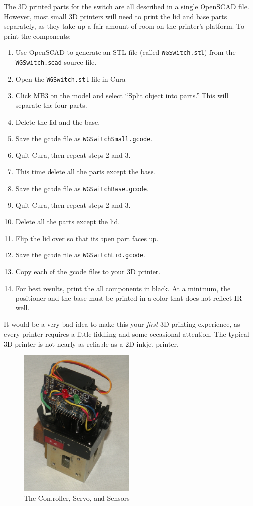 \documentclass[12pt]{article}
\begin{document}
The 3D printed parts for the switch are all described in a single
OpenSCAD file.  However, most small 3D printers will need to print
the lid and base parts separately, as they take up a fair amount
of room on the printer's platform.
To print the components:
\begin{enumerate}
\setlength\itemsep{0em}
\item Use OpenSCAD to generate an STL file (called {\tt WGSwitch.stl}) from
  the {\tt WGSwitch.scad} source file.
\item Open the {\tt WGSwitch.stl} file in Cura
\item Click MB3 on the model and select ``Split object into parts.''
  This will separate the four parts.
\item Delete the lid and the  base.
\item Save the gcode file as {\tt WGSwitchSmall.gcode}.
\item Quit Cura, then repeat steps 2 and 3.
\item This time delete all the parts except the base.
\item Save the gcode file as {\tt WGSwitchBase.gcode}.
\item Quit Cura, then repeat steps 2 and 3.
\item Delete all the parts except the lid.
\item Flip the lid over so that its open part faces up.
\item Save the gcode file as {\tt WGSwitchLid.gcode}.
\item Copy each of the gcode files to your 3D printer.
\item For best results, print the all components in black.
  At a minimum, the positioner and the base must be printed
  in a color that does not reflect IR well.
  \end{enumerate}

It would be a very bad idea to make this your {\em first} 3D printing
experience, as every printer requires a little fiddling and some
occasional attention.  The typical 3D printer is not nearly as
reliable as a 2D inkjet printer.

\begin{figure}[tb]
  \centering
  \includegraphics[width=0.5\textwidth]{BareModule.jpg}
  \caption{\label{f_naked_switch}The Controller, Servo, and Sensors}
\end{figure}
\end{document}
